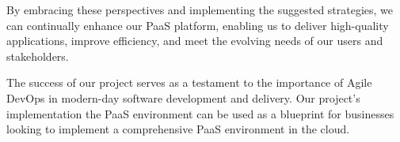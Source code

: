 \hspace{7mm}By embracing these perspectives and implementing the suggested strategies, we can continually enhance our PaaS platform, enabling us to deliver high-quality applications, improve efficiency, and meet the evolving needs of our users and stakeholders.

\hspace{7mm}The success of our project serves as a testament to the importance of Agile DevOps in modern-day software development and delivery. Our project's implementation the PaaS environment can be used as a blueprint for businesses looking to implement a comprehensive PaaS environment in the cloud.
\label{mylastpage}